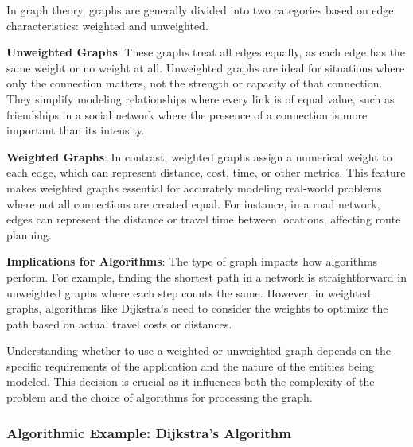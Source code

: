 \documentclass[12pt]{book} %
\begin{document}
In graph theory, graphs are generally divided into two categories based on edge characteristics: weighted and unweighted.

\textbf{Unweighted Graphs}: These graphs treat all edges equally, as each edge has the same weight or no weight at all. Unweighted graphs are ideal for situations where only the connection matters, not the strength or capacity of that connection. They simplify modeling relationships where every link is of equal value, such as friendships in a social network where the presence of a connection is more important than its intensity.

\textbf{Weighted Graphs}: In contrast, weighted graphs assign a numerical weight to each edge, which can represent distance, cost, time, or other metrics. This feature makes weighted graphs essential for accurately modeling real-world problems where not all connections are created equal. For instance, in a road network, edges can represent the distance or travel time between locations, affecting route planning.

\textbf{Implications for Algorithms}: The type of graph impacts how algorithms perform. For example, finding the shortest path in a network is straightforward in unweighted graphs where each step counts the same. However, in weighted graphs, algorithms like Dijkstra's need to consider the weights to optimize the path based on actual travel costs or distances.

Understanding whether to use a weighted or unweighted graph depends on the specific requirements of the application and the nature of the entities being modeled. This decision is crucial as it influences both the complexity of the problem and the choice of algorithms for processing the graph.


\subsubsection*{Algorithmic Example: Dijkstra's Algorithm}
\end{document}
